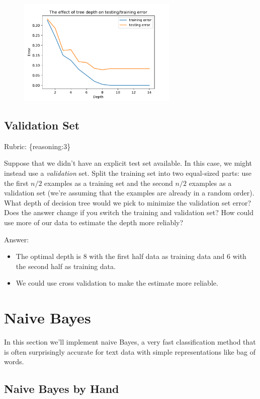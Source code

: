 \documentclass{article}
\def\rubric#1{\gre{Rubric: \{#1\}}}{}
\def\blu#1{{\color{blu}#1}}
\def\gre#1{{\color{gre}#1}}
\begin{document}
\begin{figure}[H]
\centering
\includegraphics[width=3in]{../figs/q1_1_TrainTest}
\end{figure}


\subsection{Validation Set}
\rubric{reasoning:3}

Suppose that we didn't have an explicit test set available. In this case, we might instead use a \emph{validation} set. Split the training set into two equal-sized parts: use the first $n/2$ examples as a training set and the second $n/2$ examples as a validation set (we're assuming that the examples are already in a random order). \blu{What depth of decision tree would we pick to minimize the validation set error? Does the answer change if you switch the training and validation set? How could use more of our data to  estimate the depth more reliably?}

\gre{
Answer:
\begin{itemize}
\item The optimal depth is 8 with the first half data as training data and 6 with the second half as training data.
\item We could use cross validation to make the estimate more reliable.
\end{itemize}
}

\section{Naive Bayes}

In this section we'll implement naive Bayes, a very fast classification method that is often surprisingly accurate for text data with simple representations like bag of words.



\subsection{Naive Bayes by Hand}
\end{document}
